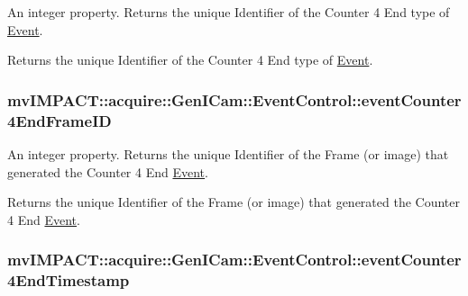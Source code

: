 An integer property. Returns the unique Identifier of the Counter 4 End type of \hyperlink{classmv_i_m_p_a_c_t_1_1acquire_1_1_event}{Event}. 

Returns the unique Identifier of the Counter 4 End type of \hyperlink{classmv_i_m_p_a_c_t_1_1acquire_1_1_event}{Event}. \hypertarget{classmv_i_m_p_a_c_t_1_1acquire_1_1_gen_i_cam_1_1_event_control_a13f9ebd2ffb9e94cc0e4ad7ae4339bd2}{
\subsubsection[{event\+Counter4\+End\+Frame\+I\+D}]{ mv\+I\+M\+P\+A\+C\+T\+::acquire\+::\+Gen\+I\+Cam\+::\+Event\+Control\+::event\+Counter4\+End\+Frame\+I\+D}}\label{classmv_i_m_p_a_c_t_1_1acquire_1_1_gen_i_cam_1_1_event_control_a13f9ebd2ffb9e94cc0e4ad7ae4339bd2}


An integer property. Returns the unique Identifier of the Frame (or image) that generated the Counter 4 End \hyperlink{classmv_i_m_p_a_c_t_1_1acquire_1_1_event}{Event}. 

Returns the unique Identifier of the Frame (or image) that generated the Counter 4 End \hyperlink{classmv_i_m_p_a_c_t_1_1acquire_1_1_event}{Event}. \hypertarget{classmv_i_m_p_a_c_t_1_1acquire_1_1_gen_i_cam_1_1_event_control_a13aeefe7418708ccc1a03d48766598d9}{
\subsubsection[{event\+Counter4\+End\+Timestamp}]{ mv\+I\+M\+P\+A\+C\+T\+::acquire\+::\+Gen\+I\+Cam\+::\+Event\+Control\+::event\+Counter4\+End\+Timestamp}}\label{classmv_i_m_p_a_c_t_1_1acquire_1_1_gen_i_cam_1_1_event_control_a13aeefe7418708ccc1a03d48766598d9}


